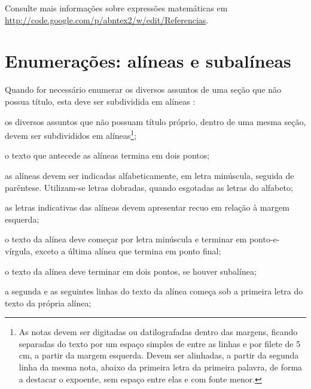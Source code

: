 Consulte mais informações sobre expressões matemáticas em \url{http://code.google.com/p/abntex2/w/edit/Referencias}.


\section{Enumerações: alíneas e subalíneas}

Quando for necessário enumerar os diversos assuntos de uma seção que não possua título, esta deve ser subdividida em alíneas \cite[4.2]{NBR6024:2012}:

\begin{alineas}

  \item os diversos assuntos que não possuam título próprio, dentro de uma mesma
  seção, devem ser subdivididos em alíneas\footnote{As notas devem ser digitadas ou datilografadas
  dentro das margens, ficando separadas do texto por um espaço simples de entre as
  linhas e por filete de 5 cm, a partir da margem esquerda. Devem ser
  alinhadas, a partir da segunda linha da mesma nota, abaixo da primeira letra
  da primeira palavra, de forma a destacar o expoente, sem espaço entre elas e
  com fonte menor. }; 
  
  \item o texto que antecede as alíneas termina em dois pontos;
  \item as alíneas devem ser indicadas alfabeticamente, em letra minúscula, seguida de parêntese. Utilizam-se letras dobradas, quando esgotadas as letras do alfabeto;

  \item as letras indicativas das alíneas devem apresentar recuo em relação à
  margem esquerda;

  \item o texto da alínea deve começar por letra minúscula e terminar em
  ponto-e-vírgula, exceto a última alínea que termina em ponto final;

  \item o texto da alínea deve terminar em dois pontos, se houver subalínea;

  \item a segunda e as seguintes linhas do texto da alínea começa sob a
  primeira letra do texto da própria alínea;
  

\end{alineas}
